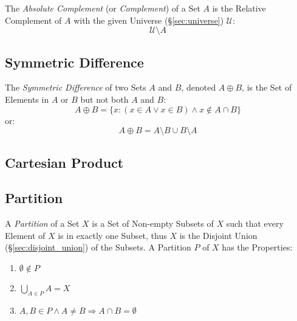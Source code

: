The \emph{Absolute Complement} (or \emph{Complement}) of a Set $A$ is
the Relative Complement of $A$ with the given Universe
(\S\ref{sec:universe}) $\mathcal{U}$:
\[
  \mathcal{U} \setminus A
\]



\subsection{Symmetric Difference}\label{sec:symmetric_difference}

The \emph{Symmetric Difference} of two Sets $A$ and $B$, denoted $A
\oplus B$, is the Set of Elements in $A$ or $B$ but not both $A$ and
$B$:
\[
  A \oplus B =
  \{ x : (x \in A \vee x \in B) \wedge x \notin A \cap B \}
\]
or:
\[
  A \oplus B = A \setminus B \cup B \setminus A
\]



\subsection{Cartesian Product}\label{sec:cartesian_product}

\subsection{Partition}\label{sec:set_partition}

A \emph{Partition} of a Set $X$ is a Set of Non-empty Subsets of $X$
such that every Element of $X$ is in exactly one Subset, thus $X$ is
the Disjoint Union (\S\ref{sec:disjoint_union}) of the Subsets. A
Partition $P$ of $X$ has the Properties:
\begin{enumerate}
  \item $\emptyset \notin P$
  \item $\bigcup_{A \in P}A = X$
  \item $A,B \in P \wedge A \neq B \Rightarrow A \cap B = \emptyset$
\end{enumerate}



